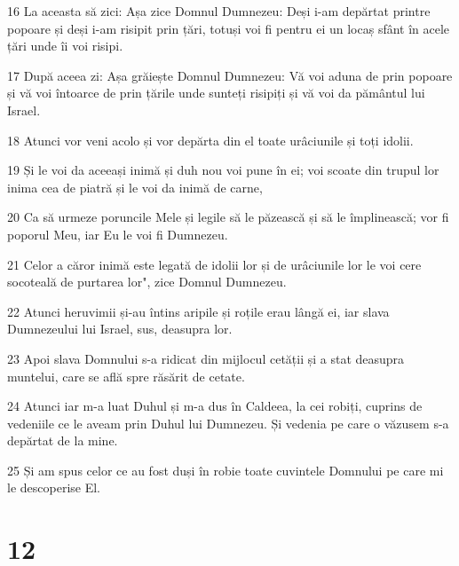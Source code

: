\par 16 La aceasta să zici: Așa zice Domnul Dumnezeu: Deși i-am depărtat printre popoare și deși i-am risipit prin țări, totuși voi fi pentru ei un locaș sfânt în acele țări unde îi voi risipi.
\par 17 După aceea zi: Așa grăiește Domnul Dumnezeu: Vă voi aduna de prin popoare și vă voi întoarce de prin țările unde sunteți risipiți și vă voi da pământul lui Israel.
\par 18 Atunci vor veni acolo și vor depărta din el toate urâciunile și toți idolii.
\par 19 Și le voi da aceeași inimă și duh nou voi pune în ei; voi scoate din trupul lor inima cea de piatră și le voi da inimă de carne,
\par 20 Ca să urmeze poruncile Mele și legile să le păzească și să le împlinească; vor fi poporul Meu, iar Eu le voi fi Dumnezeu.
\par 21 Celor a căror inimă este legată de idolii lor și de urâciunile lor le voi cere socoteală de purtarea lor", zice Domnul Dumnezeu.
\par 22 Atunci heruvimii și-au întins aripile și roțile erau lângă ei, iar slava Dumnezeului lui Israel, sus, deasupra lor.
\par 23 Apoi slava Domnului s-a ridicat din mijlocul cetății și a stat deasupra muntelui, care se află spre răsărit de cetate.
\par 24 Atunci iar m-a luat Duhul și m-a dus în Caldeea, la cei robiți, cuprins de vedeniile ce le aveam prin Duhul lui Dumnezeu. Și vedenia pe care o văzusem s-a depărtat de la mine.
\par 25 Și am spus celor ce au fost duși în robie toate cuvintele Domnului pe care mi le descoperise El.

\chapter{12}

